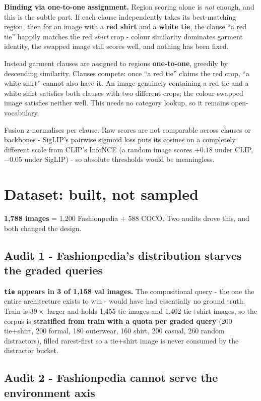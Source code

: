 \documentclass[10pt,a4paper]{article}
\begin{document}
\textbf{Binding via one-to-one assignment.} Region scoring alone is \emph{not} enough,
and this is the subtle part. If each clause independently takes its best-matching
region, then for an image with a \textbf{red shirt} and a \textbf{white tie}, the clause
``a red tie'' happily matches the red \emph{shirt} crop - colour similarity dominates
garment identity, the swapped image still scores well, and nothing has been fixed.

Instead garment clauses are assigned to regions \textbf{one-to-one}, greedily by
descending similarity. Clauses compete: once ``a red tie'' claims the red crop, ``a
white shirt'' cannot also have it. An image genuinely containing a red tie and a white
shirt satisfies both clauses with two different crops; the colour-swapped image
satisfies neither well. This needs no category lookup, so it remains open-vocabulary.

{\small Fusion z-normalises per clause. Raw scores are not comparable across clauses or
backbones - SigLIP's pairwise sigmoid loss puts its cosines on a completely different
scale from CLIP's InfoNCE (a random image scores $+0.18$ under CLIP, $-0.05$ under
SigLIP) - so absolute thresholds would be meaningless.}

\section{Dataset: built, not sampled}

\textbf{1{,}788 images} = 1{,}200 Fashionpedia + 588 COCO. Two audits drove this, and
both changed the design.

\subsection{Audit 1 - Fashionpedia's distribution starves the graded queries}

\textbf{\texttt{tie} appears in 3 of 1{,}158 val images.} The compositional query -
the one the entire architecture exists to win - would have had essentially no ground
truth. Train is $39\times$ larger and holds 1{,}455 tie images and 1{,}402 tie+shirt
images, so the corpus is \textbf{stratified from train with a quota per graded query}
(200 tie+shirt, 200 formal, 180 outerwear, 160 shirt, 200 casual, 260 random
distractors), filled rarest-first so a tie+shirt image is never consumed by the
distractor bucket.

\subsection{Audit 2 - Fashionpedia cannot serve the environment axis}
\end{document}
